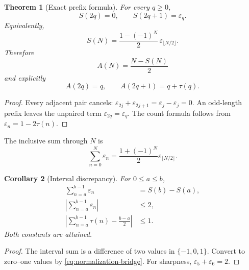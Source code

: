 \documentclass[11pt,oneside]{article}
\numberwithin{equation}{section}
\newtheorem{theorem}{Theorem}[section]
\newtheorem{corollary}[theorem]{Corollary}
\theoremstyle{definition}
\theoremstyle{remark}
\newcommand{\eps}{\varepsilon}
\begin{document}
\begin{theorem}[Exact prefix formula]
\label{thm:exact-prefix}
For every \(q\ge0\),
\begin{equation}
  \boxed{
  S(2q)=0,
  \qquad
  S(2q+1)=\eps_q.}
  \label{eq:exact-prefix}
\end{equation}
Equivalently,
\begin{equation}
  S(N)=\frac{1-(-1)^N}{2}\,
       \eps_{\lfloor N/2\rfloor}.
  \label{eq:compact-prefix}
\end{equation}
Therefore
\begin{equation}
  \boxed{
  A(N)=\frac{N-S(N)}2}
  \label{eq:ones-prefix}
\end{equation}
and explicitly
\begin{equation}
  A(2q)=q,
  \qquad
  A(2q+1)=q+\tau(q).
  \label{eq:ones-prefix-cases}
\end{equation}
\end{theorem}

\begin{proof}
Every adjacent pair cancels:
\(\eps_{2j}+\eps_{2j+1}=\eps_j-\eps_j=0\).  An odd-length prefix leaves the
unpaired term \(\eps_{2q}=\eps_q\).  The count formula follows from
\(\eps_n=1-2\tau(n)\).
\end{proof}

The inclusive sum through \(N\) is
\begin{equation}
  \sum_{n=0}^{N}\eps_n
  =\frac{1+(-1)^N}{2}\eps_{\lfloor N/2\rfloor}.
  \label{eq:inclusive-prefix}
\end{equation}

\begin{corollary}[Interval discrepancy]
\label{cor:interval-discrepancy}
For \(0\le a\le b\),
\begin{align}
  \sum_{n=a}^{b-1}\eps_n&=S(b)-S(a),
  \label{eq:interval-exact}\\
  \left|\sum_{n=a}^{b-1}\eps_n\right|&\le2,
  \label{eq:interval-signed-bound}\\
  \left|\sum_{n=a}^{b-1}\tau(n)-\frac{b-a}{2}\right|&\le1.
  \label{eq:interval-bit-bound}
\end{align}
Both constants are attained.
\end{corollary}

\begin{proof}
The interval sum is a difference of two values in \(\{-1,0,1\}\).  Convert
to zero--one values by \eqref{eq:normalization-bridge}.  For sharpness,
\(\eps_5+\eps_6=2\).
\end{proof}
\end{document}
